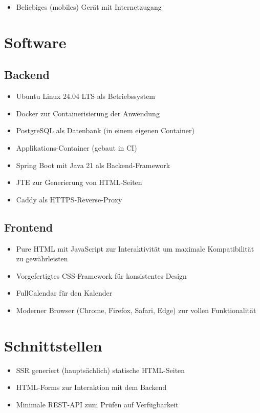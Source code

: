 \begin{itemize}
    \item Beliebiges (mobiles) Gerät mit Internetzugang
\end{itemize}

\section{Software}

\subsection{Backend}

\begin{itemize}
    \item Ubuntu Linux 24.04 LTS als Betriebssystem
    \item \gls{Docker} zur \gls{Container}isierung der Anwendung
    \item \gls{PostgreSQL} als Datenbank (in einem eigenen \gls{Container})
    \item Applikations-\gls{Container} (gebaut in \gls{CI})
    \item Spring Boot mit Java 21 als Backend-Framework
    \item JTE zur Generierung von \gls{HTML}-Seiten
    \item Caddy als HTTPS-Reverse-Proxy
\end{itemize}

\subsection{Frontend}

\begin{itemize}
    \item Pure \gls{HTML} mit \gls{JavaScript} zur Interaktivität um maximale Kompatibilität zu gewährleisten
    \item Vorgefertigtes \gls{CSS}-Framework für konsistentes Design
    \item FullCalendar für den Kalender
    \item Moderner \gls{Browser} (Chrome, Firefox, Safari, Edge) zur vollen Funktionalität
\end{itemize}

\section{Schnittstellen}

\begin{itemize}
    \item \gls{SSR} generiert (hauptsächlich) statische \gls{HTML}-Seiten
    \item \gls{HTML}-Forms zur Interaktion mit dem Backend
    \item Minimale \gls{REST}-\gls{API} zum Prüfen auf Verfügbarkeit
\end{itemize}